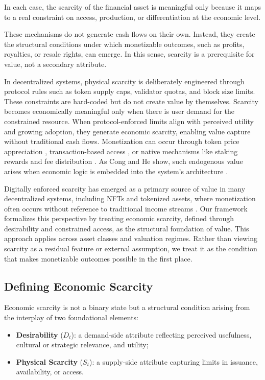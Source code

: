 \documentclass[12pt]{article}
\begin{document}
In each case, the scarcity of the financial asset is meaningful only because it maps to a real constraint on access, production, or differentiation at the economic level.

These mechanisms do not generate cash flows on their own. Instead, they create the structural conditions under which monetizable outcomes, such as profits, royalties, or resale rights, can emerge. In this sense, scarcity is a prerequisite for value, not a secondary attribute.

In decentralized systems, physical scarcity is deliberately engineered through protocol rules such as token supply caps, validator quotas, and block size limits. These constraints are hard-coded but do not create value by themselves. Scarcity becomes economically meaningful only when there is user demand for the constrained resource. When protocol-enforced limits align with perceived utility and growing adoption, they generate economic scarcity, enabling value capture without traditional cash flows. Monetization can occur through token price appreciation \citep{hayes2015cost}, transaction-based access \citep{lu2025unveiling}, or native mechanisms like staking rewards and fee distribution \citep{saleh2021blockchain, ramachandran2021defi}. As Cong and He show, such endogenous value arises when economic logic is embedded into the system's architecture \citep{cong2019blockchain}.



Digitally enforced scarcity has emerged as a primary source of value in many decentralized systems, including NFTs and tokenized assets, where monetization often occurs without reference to traditional income streams \citep{lu2025unveiling}. Our framework formalizes this perspective by treating economic scarcity, defined through desirability and constrained access, as the structural foundation of value. This approach applies across asset classes and valuation regimes. Rather than viewing scarcity as a residual feature or external assumption, we treat it as the condition that makes monetizable outcomes possible in the first place.

\subsection{Defining Economic Scarcity}

Economic scarcity is not a binary state but a structural condition arising from the interplay of two foundational elements:
\begin{itemize}
  \item \textbf{Desirability} (\( D_t \)): a demand-side attribute reflecting perceived usefulness, cultural or strategic relevance, and utility;
  \item \textbf{Physical Scarcity} (\( S_t \)): a supply-side attribute capturing limits in issuance, availability, or access.
\end{itemize}
\end{document}
